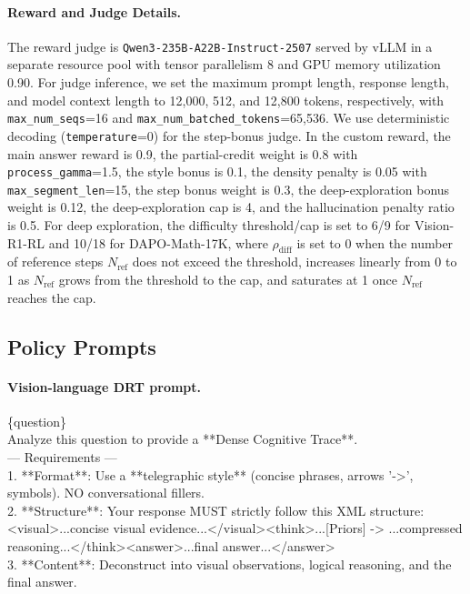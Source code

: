 \paragraph{Reward and Judge Details.}
The reward judge is \texttt{Qwen3-235B-A22B-Instruct-2507} served by vLLM in a separate resource pool with tensor parallelism 8 and GPU memory utilization 0.90.
For judge inference, we set the maximum prompt length, response length, and model context length to 12{,}000, 512, and 12{,}800 tokens, respectively, with \texttt{max\_num\_seqs}=16 and \texttt{max\_num\_batched\_tokens}=65{,}536.
We use deterministic decoding (\texttt{temperature}=0) for the step-bonus judge.
In the custom reward, the main answer reward is 0.9, the partial-credit weight is 0.8 with \texttt{process\_gamma}=1.5, the style bonus is 0.1, the density penalty is 0.05 with \texttt{max\_segment\_len}=15, the step bonus weight is 0.3, the deep-exploration bonus weight is 0.12, the deep-exploration cap is 4, and the hallucination penalty ratio is 0.5.
For deep exploration, the difficulty threshold/cap is set to 6/9 for Vision-R1-RL and 10/18 for DAPO-Math-17K, where $\rho_{\text{diff}}$ is set to 0 when the number of reference steps $N_{\text{ref}}$ does not exceed the threshold, increases linearly from 0 to 1 as $N_{\text{ref}}$ grows from the threshold to the cap, and saturates at 1 once $N_{\text{ref}}$ reaches the cap.

\subsection{Policy Prompts}
\paragraph{Vision-language DRT prompt.}
\begin{promptbox}
\{question\}\\
Analyze this question to provide a **Dense Cognitive Trace**.\\
--- Requirements ---\\
1. **Format**: Use a **telegraphic style** (concise phrases, arrows '-\textgreater{}', symbols). NO conversational fillers.\\
2. **Structure**: Your response MUST strictly follow this XML structure:\\
\textless{}visual\textgreater{}...concise visual evidence...\textless{}/visual\textgreater{}\textless{}think\textgreater{}...[Priors] -\textgreater{} ...compressed reasoning...\textless{}/think\textgreater{}\textless{}answer\textgreater{}...final answer...\textless{}/answer\textgreater{}\\
3. **Content**: Deconstruct into visual observations, logical reasoning, and the final answer.
\end{promptbox}

